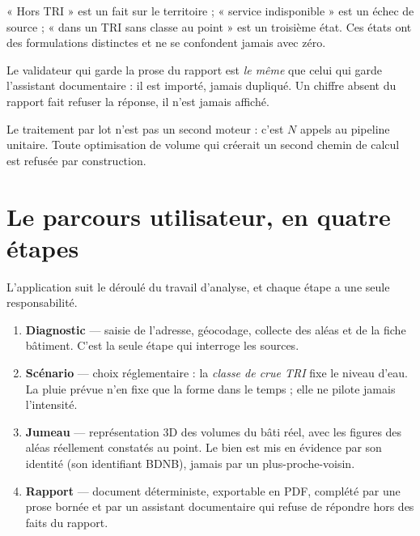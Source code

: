 \begin{invariant}[title={I2 — L'absence est un fait, pas une panne}]
« Hors TRI » est un fait sur le territoire ; « service indisponible » est un
échec de source ; « dans un TRI sans classe au point » est un troisième état.
Ces états ont des formulations distinctes et ne se confondent jamais avec zéro.
\end{invariant}

\begin{invariant}[title={I3 — Un seul ancrage pour les chiffres}]
Le validateur qui garde la prose du rapport est \emph{le même} que celui qui
garde l'assistant documentaire : il est importé, jamais dupliqué. Un chiffre
absent du rapport fait refuser la réponse, il n'est jamais affiché.
\end{invariant}

\begin{invariant}[title={I4 — Une seule implémentation du calcul}]
Le traitement par lot n'est pas un second moteur : c'est \(N\) appels au
pipeline unitaire. Toute optimisation de volume qui créerait un second chemin de
calcul est refusée par construction.
\end{invariant}

\section{Le parcours utilisateur, en quatre étapes}

L'application suit le déroulé du travail d'analyse, et chaque étape a une seule
responsabilité.

\begin{enumerate}
  \item \textbf{Diagnostic} — saisie de l'adresse, géocodage, collecte des aléas
    et de la fiche bâtiment. C'est la seule étape qui interroge les sources.
  \item \textbf{Scénario} — choix réglementaire : la \emph{classe de crue TRI}
    fixe le niveau d'eau. La pluie prévue n'en fixe que la forme dans le temps ;
    elle ne pilote jamais l'intensité.
  \item \textbf{Jumeau} — représentation 3D des volumes du bâti réel, avec les
    figures des aléas réellement constatés au point. Le bien est mis en évidence
    par son identité (son identifiant BDNB), jamais par un plus-proche-voisin.
  \item \textbf{Rapport} — document déterministe, exportable en PDF, complété par
    une prose bornée et par un assistant documentaire qui refuse de répondre hors
    des faits du rapport.
\end{enumerate}

